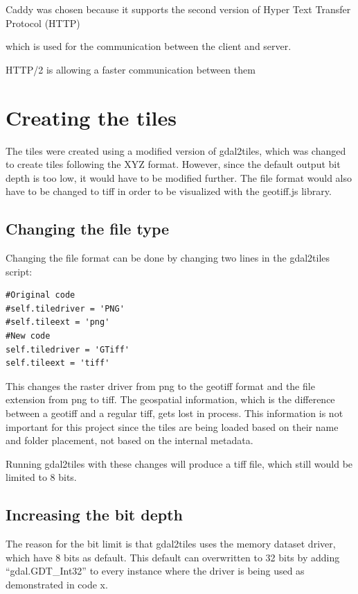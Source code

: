 Caddy was chosen because it supports the second version of Hyper Text Transfer Protocol (HTTP)
\citep{WhyCaddy}



which is used for the communication between the client and server.
\citep{WhatIsHTTP}

HTTP/2 is allowing a faster communication between them

\citep{HTTP2}

\section{Creating the tiles}
The tiles were created using a modified version of gdal2tiles, which was changed to create tiles following the XYZ format. However, since the default output bit depth is too low, it would have to be modified further. The file format would also have to be changed to tiff in order to be visualized with the geotiff.js library. 

\subsection{Changing the file type}
Changing the file format can be done by changing two lines in the gdal2tiles script:

\begin{lstlisting}[language=iPython, caption={Changing the file format}, label= VoresPY,escapechar=|]
#Original code
#self.tiledriver = 'PNG'
#self.tileext = 'png'
#New code
self.tiledriver = 'GTiff'
self.tileext = 'tiff'
\end{lstlisting}
This changes the raster driver from png to the geotiff format and the file extension from png to tiff. 
\citep{RasterDrivers}
The geospatial information, which is the difference between a geotiff and a regular tiff, gets lost in process. This information is not important for this project since the tiles are being loaded based on their name and folder placement, not based on the internal metadata.

Running gdal2tiles with these changes will produce a tiff file, which still would be limited to 8 bits. 
\subsection{Increasing the bit depth}
The reason for the bit limit is that gdal2tiles uses the memory dataset driver, which have 8 bits as default.  This default can overwritten to 32 bits by adding “gdal.GDT\_Int32” to every instance where the driver is being used as demonstrated in code x. 
\citep{MoreThan8}

